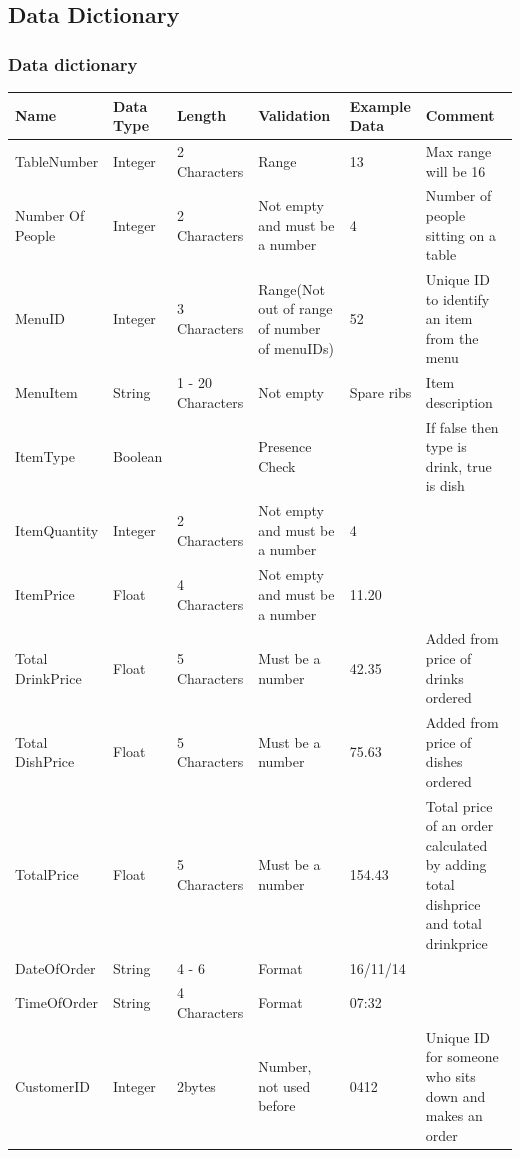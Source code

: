 	
\subsection{Data Dictionary}

\subsubsection{Data dictionary}

\begin{center}

\begin{longtable}{ | p{2cm}| p{1cm} | p{1cm} | p{2cm} | p{1cm} | p{3cm} | }
    \hline
    \textbf{Name} & \textbf{Data Type} & \textbf{Length} & \textbf{Validation} &\textbf{Example Data} & \textbf{Comment} \\ \hline
   TableNumber & Integer & 2 Characters & Range  & 13 & Max range will be 16 \\ \hline
   Number Of People & Integer & 2 Characters& Not empty and must be a number  & 4 & Number of people sitting on a table \\ \hline
  MenuID & Integer & 3 Characters& Range(Not out of range of number of menuIDs) & 52 & Unique ID to identify an item from the menu \\ \hline
   MenuItem & String & 1 - 20 Characters & Not empty  & Spare ribs & Item description\\ \hline
   ItemType&Boolean& &Presence Check & &If false then type is drink, true is dish \\ \hline
   ItemQuantity & Integer & 2 Characters & Not empty and must be a number  & 4 &\\ \hline
   ItemPrice & Float & 4 Characters & Not empty and must be a number  &11.20 &\\ \hline
   Total DrinkPrice & Float & 5 Characters & Must be a number & 42.35 & Added from price of drinks ordered \\ \hline
   Total DishPrice & Float & 5 Characters & Must be a number&  75.63  &  Added from price of dishes ordered \\ \hline
    TotalPrice & Float & 5 Characters & Must be a number & 154.43 & Total price of an order calculated by adding total dishprice and total drinkprice\\ \hline
   DateOfOrder &String & 4 - 6 & Format  & 16/11/14 & \\ \hline
   TimeOfOrder &String & 4 Characters & Format & 07:32 &  \\ \hline
    CustomerID & Integer & 2bytes & Number, not used before& 0412 & Unique ID for someone who sits down and makes an order \\ \hline

\end{longtable}
\end{center}
